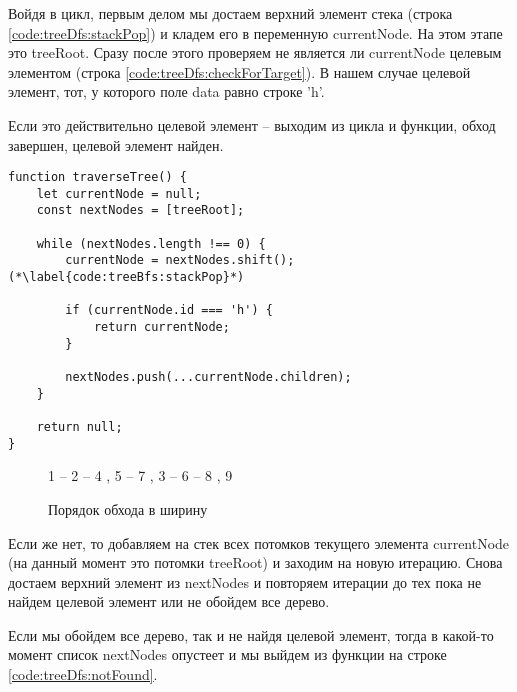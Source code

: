 \documentclass[../../article]{subfiles}
\begin{document}
Войдя в цикл, первым делом мы достаем верхний элемент стека (строка \ref{code:treeDfs:stackPop}) и кладем его в переменную {\firacodebold currentNode}. На этом этапе это {\firacodebold treeRoot}. Сразу после этого проверяем не является ли {\firacodebold currentNode} целевым элементом (строка \ref{code:treeDfs:checkForTarget}). В нашем случае целевой элемент, тот, у которого поле {\firacodebold data} равно строке {\firacodebold 'h'}.

Если это действительно целевой элемент – выходим из цикла и функции, обход завершен, целевой элемент найден.

\begin{figure*}
    \begin{ruledelement}
        \begin{lstlisting}[caption={Обход дерева в ширину}, label={lst:treeBfs}]
function traverseTree() {
    let currentNode = null;
    const nextNodes = [treeRoot];

    while (nextNodes.length !== 0) {
        currentNode = nextNodes.shift(); (*\label{code:treeBfs:stackPop}*)

        if (currentNode.id === 'h') {
            return currentNode;
        }

        nextNodes.push(...currentNode.children);
    }

    return null;
}

        \end{lstlisting}
    \end{ruledelement}
\end{figure*}

\begin{figure}
    \styledgraph
    {
        1 -- { 2 -- { 4 , 5 -- 7 }, 3 -- 6 -- { 8 , 9 }}
    }
    \caption{Порядок обхода в ширину}
    \label{fig:treeBfsOrder}
\end{figure}

Если же нет, то добавляем на стек всех потомков текущего элемента {\firacodebold currentNode} (на данный момент это потомки {\firacodebold treeRoot}) и заходим на новую итерацию. Снова достаем верхний элемент из {\firacodebold nextNodes} и повторяем итерации до тех пока не найдем целевой элемент или не обойдем все дерево.

Если мы обойдем все дерево, так и не найдя целевой элемент, тогда в какой-то момент список {\firacodebold nextNodes} опустеет и мы выйдем из функции на строке \ref{code:treeDfs:notFound}.
\end{document}
